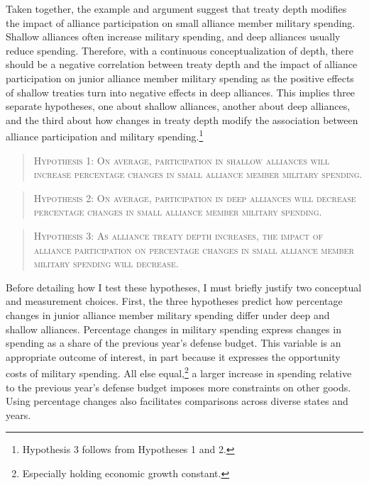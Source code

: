 \documentclass[12pt]{article}
\begin{document}
 
Taken together, the example and argument suggest that treaty depth modifies the impact of alliance participation on small alliance member military spending. 
Shallow alliances often increase military spending, and deep alliances usually reduce spending.  
Therefore, with a continuous conceptualization of depth, there should be a negative correlation between treaty depth and the impact of alliance participation on junior alliance member military spending as the positive effects of shallow treaties turn into negative effects in deep alliances. 
This implies three separate hypotheses, one about shallow alliances, another about deep alliances, and the third about how changes in treaty depth modify the association between alliance participation and military spending.\footnote{Hypothesis 3 follows from Hypotheses 1 and 2.}
 

\begin{quote}
\textsc{Hypothesis 1: On average, participation in shallow alliances will increase percentage changes in small alliance member military spending.}
\end{quote}

\begin{quote}
\textsc{Hypothesis 2: On average, participation in deep alliances will decrease percentage changes in small alliance member military spending.}
\end{quote}

\begin{quote}
\textsc{Hypothesis 3: As alliance treaty depth increases, the impact of alliance participation on percentage changes in small alliance member military spending will decrease.}
\end{quote}


Before detailing how I test these hypotheses, I must briefly justify two conceptual and measurement choices. 
First, the three hypotheses predict how percentage changes in junior alliance member military spending differ under deep and shallow alliances. 
Percentage changes in military spending express changes in spending as a share of the previous year's defense budget.
This variable is an appropriate outcome of interest, in part because it expresses the opportunity costs of military spending. 
All else equal,\footnote{Especially holding economic growth constant.} a larger increase in spending relative to the previous year's defense budget imposes more constraints on other goods. 
Using percentage changes also facilitates comparisons across diverse states and years. 
\end{document}
